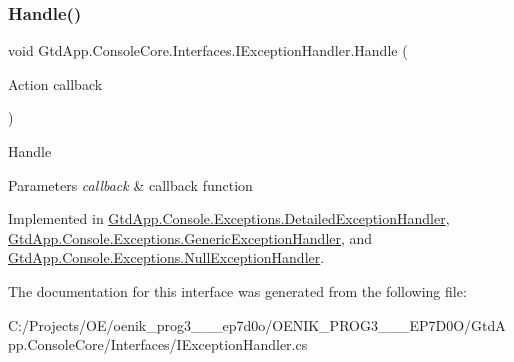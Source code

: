 \subsubsection{\texorpdfstring{Handle()}{Handle()}}
{\footnotesize\ttfamily void Gtd\+App.\+Console\+Core.\+Interfaces.\+I\+Exception\+Handler.\+Handle (\begin{DoxyParamCaption}\item[{Action}]{callback }\end{DoxyParamCaption})}



Handle 


\begin{DoxyParams}{Parameters}
{\em callback} & callback function\\
\hline
\end{DoxyParams}


Implemented in \mbox{\hyperlink{class_gtd_app_1_1_console_1_1_exceptions_1_1_detailed_exception_handler_a27a7e6418026056bcc76096165124e65}{Gtd\+App.\+Console.\+Exceptions.\+Detailed\+Exception\+Handler}}, \mbox{\hyperlink{class_gtd_app_1_1_console_1_1_exceptions_1_1_generic_exception_handler_ad27db6275cb1cd84431622f1f941173a}{Gtd\+App.\+Console.\+Exceptions.\+Generic\+Exception\+Handler}}, and \mbox{\hyperlink{class_gtd_app_1_1_console_1_1_exceptions_1_1_null_exception_handler_a78f13c93cb7c384268b06b609abbce9f}{Gtd\+App.\+Console.\+Exceptions.\+Null\+Exception\+Handler}}.



The documentation for this interface was generated from the following file\+:\begin{DoxyCompactItemize}
\item 
C\+:/\+Projects/\+O\+E/oenik\+\_\+prog3\+\_\+\_\+\_\+ep7d0o/\+O\+E\+N\+I\+K\+\_\+\+P\+R\+O\+G3\+\_\+\_\+\_\+\+E\+P7\+D0\+O/\+Gtd\+App.\+Console\+Core/\+Interfaces/I\+Exception\+Handler.\+cs\end{DoxyCompactItemize}
